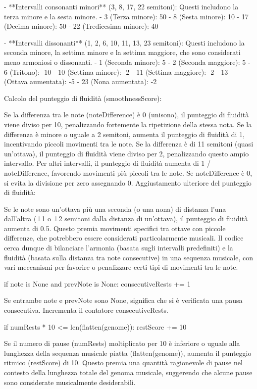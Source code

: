 \documentclass[a4paper,12pt]{report}
\begin{document}
- **Intervalli consonanti minori** (3, 8, 17, 22 semitoni): Questi includono la terza minore e la sesta minore.
    - 3 (Terza minore): 50
    - 8 (Sesta minore): 10
    - 17 (Decima minore): 50
    - 22 (Tredicesima minore): 40

- **Intervalli dissonanti** (1, 2, 6, 10, 11, 13, 23 semitoni): Questi includono la seconda minore, la settima minore e la settima maggiore, che sono considerati meno armoniosi o dissonanti.
    - 1 (Seconda minore): 5
    - 2 (Seconda maggiore): 5
    - 6 (Tritono): -10
    - 10 (Settima minore): -2
    - 11 (Settima maggiore): -2
    - 13 (Ottava aumentata): -5
    - 23 (Nona aumentata): -2
    
Calcolo del punteggio di fluidità (smoothnessScore):

Se la differenza tra le note (noteDifference) è 0 (unisono), il punteggio di fluidità viene diviso per 10, penalizzando fortemente la ripetizione della stessa nota.
Se la differenza è minore o uguale a 2 semitoni, aumenta il punteggio di fluidità di 1, incentivando piccoli movimenti tra le note.
Se la differenza è di 11 semitoni (quasi un'ottava), il punteggio di fluidità viene diviso per 2, penalizzando questo ampio intervallo.
Per altri intervalli, il punteggio di fluidità aumenta di 1 / noteDifference, favorendo movimenti più piccoli tra le note. 
Se noteDifference è 0, si evita la divisione per zero assegnando 0.
Aggiustamento ulteriore del punteggio di fluidità:

Se le note sono un'ottava più una seconda (o una nona) di distanza l'una dall'altra (±1 o ±2 semitoni dalla distanza di un'ottava), il punteggio di fluidità aumenta di 0.5. 
Questo premia movimenti specifici tra ottave con piccole differenze, che potrebbero essere considerati particolarmente musicali.
Il codice cerca dunque di bilanciare l'armonia (basata sugli intervalli predefiniti) e la fluidità (basata sulla distanza tra note consecutive) in una sequenza musicale, con vari meccanismi per favorire o penalizzare certi tipi di movimenti tra le note.

if note is None and prevNote is None:
    consecutiveRests += 1

Se entrambe note e prevNote sono None, significa che si è verificata una pausa consecutiva. Incrementa il contatore consecutiveRests.

if numRests * 10 <= len(flatten(genome)):
    restScore += 10

Se il numero di pause (numRests) moltiplicato per 10 è inferiore o uguale alla lunghezza della sequenza musicale piatta (flatten(genome)), aumenta il punteggio ritmico (restScore) di 10. 
Questo premia una quantità ragionevole di pause nel contesto della lunghezza totale del genoma musicale, suggerendo che alcune pause sono considerate musicalmente desiderabili.
\end{document}
